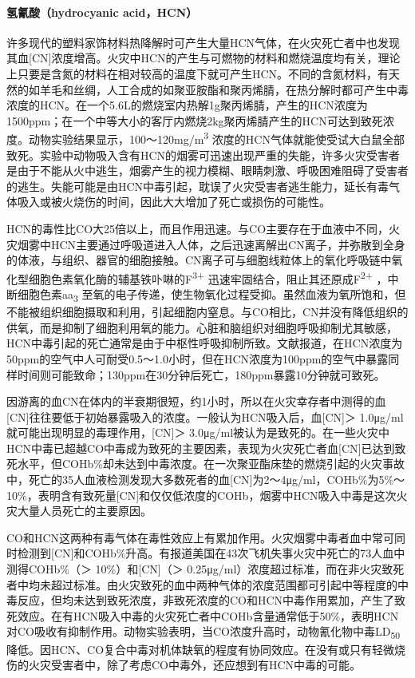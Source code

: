 \paragraph{氢氰酸（hydrocyanic acid，HCN）}

许多现代的塑料家饰材料热降解时可产生大量HCN气体，在火灾死亡者中也发现其血{[}CN{]}浓度增高。火灾中HCN的产生与可燃物的材料和燃烧温度均有关，理论上只要是含氮的材料在相对较高的温度下就可产生HCN。不同的含氮材料，有天然的如羊毛和丝绸，人工合成的如聚亚胺酯和聚丙烯腈，在热分解时都可产生中毒浓度的HCN。在一个5.6L的燃烧室内热解1g聚丙烯腈，产生的HCN浓度为1500ppm；在一个中等大小的客厅内燃烧2kg聚丙烯腈产生的HCN可达到致死浓度。动物实验结果显示，100～120mg/m\textsuperscript{3}
浓度的HCN气体就能使受试大白鼠全部致死。实验中动物吸入含有HCN的烟雾可迅速出现严重的失能，许多火灾受害者是由于不能从火中逃生，烟雾产生的视力模糊、眼睛刺激、呼吸困难阻碍了受害者的逃生。失能可能是由HCN中毒引起，耽误了火灾受害者逃生能力，延长有毒气体吸入或被火烧伤的时间，因此大大增加了死亡或损伤的可能性。

HCN的毒性比CO大25倍以上，而且作用迅速。与CO主要存在于血液中不同，火灾烟雾中HCN主要通过呼吸道进入人体，之后迅速离解出CN离子，并弥散到全身的体液，与组织、器官的细胞接触。CN离子可与细胞线粒体上的氧化呼吸链中氧化型细胞色素氧化酶的辅基铁卟啉的F\textsuperscript{3+}
迅速牢固结合，阻止其还原成F\textsuperscript{2+}
，中断细胞色素aa\textsubscript{3}
至氧的电子传递，使生物氧化过程受抑。虽然血液为氧所饱和，但不能被组织细胞摄取和利用，引起细胞内窒息。与CO相比，CN并没有降低组织的供氧，而是抑制了细胞利用氧的能力。心脏和脑组织对细胞呼吸抑制尤其敏感，HCN中毒引起的死亡通常是由于中枢性呼吸抑制所致。文献报道，在HCN浓度为50ppm的空气中人可耐受0.5～1.0小时，但在HCN浓度为100ppm的空气中暴露同样时间则可能致命；130ppm在30分钟后死亡，180ppm暴露10分钟就可致死。

因游离的血CN在体内的半衰期很短，约1小时，所以在火灾幸存者中测得的血{[}CN{]}往往要低于初始暴露吸入的浓度。一般认为HCN吸入后，血{[}CN{]}＞
1.0μg/ml就可能出现明显的毒理作用，{[}CN{]}＞
3.0μg/ml被认为是致死的。在一些火灾中HCN中毒已超越CO中毒成为致死的主要因素，表现为火灾死亡者血{[}CN{]}已达到致死水平，但COHb\%却未达到中毒浓度。在一次聚亚酯床垫的燃烧引起的火灾事故中，死亡的35人血液检测发现大多数死者的血{[}CN{]}为2～4μg/ml，COHb\%为5\%～10\%，表明含有致死量{[}CN{]}和仅仅低浓度的COHb，烟雾中HCN吸入中毒是这次火灾大量人员死亡的主要原因。

CO和HCN这两种有毒气体在毒性效应上有累加作用。火灾烟雾中毒者血中常可同时检测到{[}CN{]}和COHb\%升高。有报道美国在43次飞机失事火灾中死亡的73人血中测得COHb\%（＞
10\%）和{[}CN{]}（＞
0.25μg/ml）浓度超过标准，而在非火灾致死者中均未超过标准。由火灾致死的血中两种气体的浓度范围都可引起中等程度的中毒反应，但均未达到致死浓度，非致死浓度的CO和HCN中毒作用累加，产生了致死效应。在有HCN吸入中毒的火灾死亡者中COHb含量通常低于50\%，表明HCN对CO吸收有抑制作用。动物实验表明，当CO浓度升高时，动物氰化物中毒LD\textsubscript{50}
降低。因HCN、CO复合中毒对机体缺氧的程度有协同效应。在没有或只有轻微烧伤的火灾受害者中，除了考虑CO中毒外，还应想到有HCN中毒的可能。

